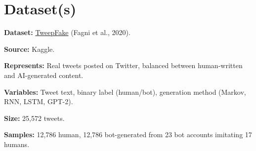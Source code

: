 \section*{Dataset(s)}



\textbf{Dataset:} \href{https://www.kaggle.com/datasets/mtesconi/twitter-deep-fake-text}{TweepFake} (Fagni et al., 2020). 

\textbf{Source:} Kaggle. 

\textbf{Represents:} Real tweets posted on Twitter, balanced between human-written and AI-generated content. 

\textbf{Variables:} Tweet text, binary label (human/bot), generation method (Markov, RNN, LSTM, GPT-2). 

\textbf{Size:} 25,572 tweets. 

\textbf{Samples:} 12,786 human, 12,786 bot-generated from 23 bot accounts imitating 17 humans.

